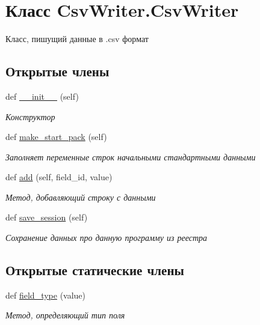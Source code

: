 \hypertarget{classCsvWriter_1_1CsvWriter}{}\section{Класс Csv\+Writer.\+Csv\+Writer}
\label{classCsvWriter_1_1CsvWriter}


Класс, пишущий данные в {\ttfamily .csv} формат  


\subsection*{Открытые члены}
\begin{DoxyCompactItemize}
\item 
def \hyperlink{classCsvWriter_1_1CsvWriter_aa46f0b7a79563167fff4906843f3ad00}{\+\_\+\+\_\+init\+\_\+\+\_\+} (self)
\begin{DoxyCompactList}\small\item\em Конструктор \end{DoxyCompactList}\item 
def \hyperlink{classCsvWriter_1_1CsvWriter_a82a1a0b729344761424248f4e8357abf}{make\+\_\+start\+\_\+pack} (self)
\begin{DoxyCompactList}\small\item\em Заполняет переменные строк начальными стандартными данными \end{DoxyCompactList}\item 
def \hyperlink{classCsvWriter_1_1CsvWriter_aa15d806d5045226507d60be0b8e25fab}{add} (self, field\+\_\+id, value)
\begin{DoxyCompactList}\small\item\em Метод, добавляющий строку с данными \end{DoxyCompactList}\item 
def \hyperlink{classCsvWriter_1_1CsvWriter_a9ce130eed2e7aac0e223740206519836}{save\+\_\+session} (self)
\begin{DoxyCompactList}\small\item\em Сохранение данных про данную программу из реестра \end{DoxyCompactList}\end{DoxyCompactItemize}
\subsection*{Открытые статические члены}
\begin{DoxyCompactItemize}
\item 
def \hyperlink{classCsvWriter_1_1CsvWriter_a3c0708fb8d6c9a9a72eee1027b4a336e}{field\+\_\+type} (value)
\begin{DoxyCompactList}\small\item\em Метод, определяющий тип поля \end{DoxyCompactList}\end{DoxyCompactItemize}
